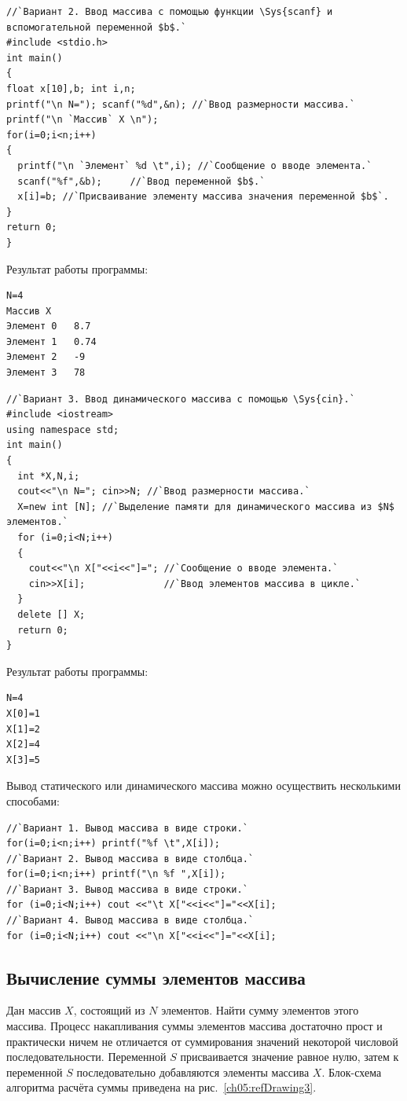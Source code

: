 \begin{lstlisting}
//`Вариант 2. Ввод массива с помощью функции \Sys{scanf} и вспомогательной переменной $b$.`
#include <stdio.h>
int main()
{
float x[10],b; int i,n; 
printf("\n N="); scanf("%d",&n); //`Ввод размерности массива.`
printf("\n `Массив` X \n"); 
for(i=0;i<n;i++) 
{ 
  printf("\n `Элемент` %d \t",i); //`Сообщение о вводе элемента.`
  scanf("%f",&b);     //`Ввод переменной $b$.`
  x[i]=b; //`Присваивание элементу массива значения переменной $b$`.
} 
return 0;
}
\end{lstlisting}

Результат работы программы:
\begin{verbatim}
N=4 
Массив X 
Элемент 0 	8.7 
Элемент 1 	0.74 
Элемент 2 	-9 
Элемент 3 	78 
\end{verbatim}

\begin{lstlisting}
//`Вариант 3. Ввод динамического массива с помощью \Sys{cin}.`
#include <iostream>
using namespace std;
int main()
{
  int *X,N,i;
  cout<<"\n N="; cin>>N; //`Ввод размерности массива.`
  X=new int [N]; //`Выделение памяти для динамического массива из $N$ элементов.`
  for (i=0;i<N;i++)
  {
    cout<<"\n X["<<i<<"]="; //`Сообщение о вводе элемента.`
    cin>>X[i];              //`Ввод элементов массива в цикле.`
  }
  delete [] X;
  return 0;
}
\end{lstlisting}

Результат работы программы:
\begin{verbatim}
N=4 
X[0]=1 
X[1]=2 
X[2]=4 
X[3]=5 
\end{verbatim}

Вывод статического или динамического массива можно осуществить несколькими способами:

\begin{lstlisting}
//`Вариант 1. Вывод массива в виде строки.`
for(i=0;i<n;i++) printf("%f \t",X[i]);
//`Вариант 2. Вывод массива в виде столбца.`
for(i=0;i<n;i++) printf("\n %f ",X[i]);
//`Вариант 3. Вывод массива в виде строки.`
for (i=0;i<N;i++) cout <<"\t X["<<i<<"]="<<X[i];
//`Вариант 4. Вывод массива в виде столбца.`
for (i=0;i<N;i++) cout <<"\n X["<<i<<"]="<<X[i];
\end{lstlisting}

\subsection[Вычисление суммы элементов массива]{Вычисление суммы элементов массива}
Дан массив $X$, состоящий из $N$ элементов. Найти сумму элементов этого массива.
Процесс накапливания суммы элементов массива достаточно прост и практически
ничем не отличается от суммирования значений некоторой числовой последовательности. Переменной $S$
присваивается значение равное нулю, затем к переменной $S$ последовательно добавляются элементы
 массива $X$. Блок-схема
алгоритма расчёта суммы приведена на рис.~\ref{ch05:refDrawing3}.

